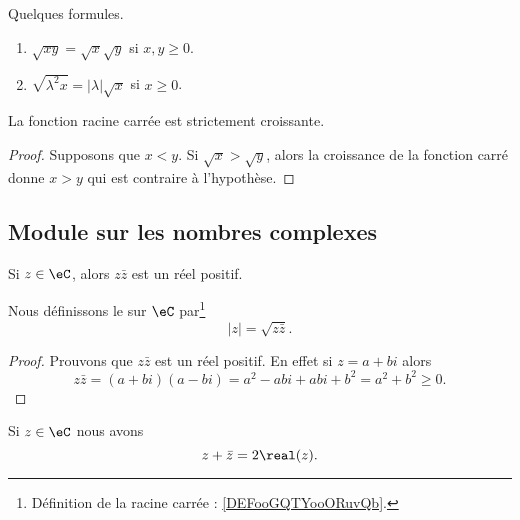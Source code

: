 \begin{lemma}       \label{LEMooWSVNooKsymDy}
    Quelques formules.
    \begin{enumerate}
        \item
        $\sqrt{ xy }=\sqrt{ x }\sqrt{ y }$ si \( x,y\geq 0\).
    \item       \label{ITEMooEPHBooCEeJOD}
        \( \sqrt{ \lambda^2 x }=| \lambda |\sqrt{ x }\) si \( x\geq 0\).
    \end{enumerate}
\end{lemma}

\begin{lemma}       \label{LEMooSBOAooOOIotR}
	La fonction racine carrée est strictement croissante.
\end{lemma}

\begin{proof}
	Supposons que \( x<y\). Si \( \sqrt{ x }>\sqrt{ y }\), alors la croissance de la fonction carré donne \( x>y\) qui est contraire à l'hypothèse.
\end{proof}

\subsection{Module sur les nombres complexes}

\begin{lemmaDef}        \label{LEMooVHDAooJyoakR}
	Si \( z\in \eC\), alors \( z\bar z\) est un réel positif.

	Nous définissons le  sur \( \eC\) par\footnote{Définition de la racine carrée : \ref{DEFooGQTYooORuvQb}.}
	\begin{equation}
		| z |=\sqrt{ z\bar z }.
	\end{equation}
\end{lemmaDef}

\begin{proof}
	Prouvons que \( z\bar z\) est un réel positif. En effet si \( z=a+bi\) alors
	\begin{equation}
		z\bar z=(a+bi)(a-bi)=a^2-abi+abi+b^2=a^2+b^2\geq 0.
	\end{equation}
\end{proof}

\begin{lemma}       \label{LEMooJRLWooScVrkG}
	Si \( z\in \eC\) nous avons
	\begin{equation}        \label{EQooQDGTooBejPUE}
		z+\bar z=2\real(z).
	\end{equation}
\end{lemma}

